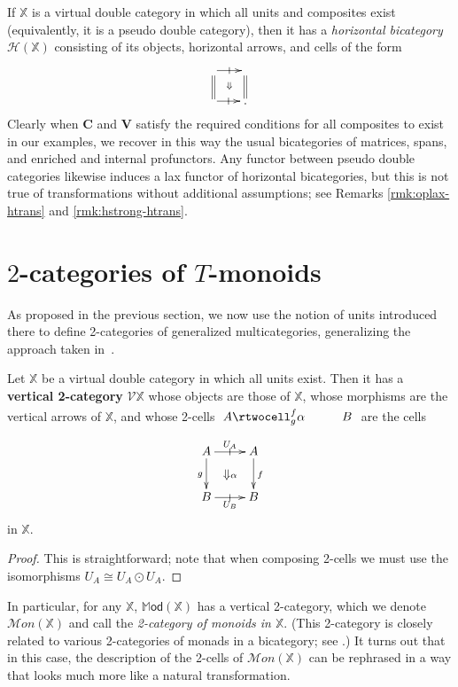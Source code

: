 \documentclass{tac}
\makeatletter
\newcommand{\calV}{\ensuremath{\mathcal{V}}}
\newcommand{\calH}{\ensuremath{\mathcal{H}}}
\newcommand{\mb}[1]{{\mathbf{#1}}}
\newcommand{\iso}{\cong}
\newcommand{\MOD}{\mathbb{M}\mathsf{od}}
\newcommand{\Mon}{\mathcal{M}\mathit{on}}
\numberwithin{equation}{section}
\def\currthmtype{}
\let\old@label\label
\def\label#1{%
    {\let\your@currentlabel\@currentlabel%
      \edef\@currentlabel{\currthmtype}%
      \old@label{label@name@#1}}%
    \old@label{#1}}
\makeatother
\begin{document}
\begin{remark}\label{rmk:horiz-bicat}
  If $\mathbb{X}$ is a virtual double category in which all units and
  composites exist (equivalently, it is a pseudo double category),
  then it has a \emph{horizontal bicategory} $\calH(\mathbb{X})$
  consisting of its objects, horizontal arrows, and cells of the
  form
  \[\xymatrix@-.5pc{ \ar[r]|-@{|}^-{} \ar@{=}[d] \ar@{}[dr]|{\Downarrow} &  \ar@{=}[d]\\
    \ar[r]|-@{|}_-{} & .}\]
  Clearly when $\mb{C}$ and $\mb{V}$ satisfy the required conditions
  for all composites to exist in our examples, we recover in this way
  the usual bicategories of matrices, spans, and enriched and internal
  profunctors.  Any functor between pseudo double categories likewise
  induces a lax functor of horizontal bicategories, but
  this is not true of transformations without additional assumptions;
  see Remarks \ref{rmk:oplax-htrans} and \ref{rmk:hstrong-htrans}.
\end{remark}


\section{$2$-categories of $T$-monoids}
\label{sec:2cat-tmon}

As proposed in the previous section, we now use the notion of units
introduced there to define 2-categories of generalized
multicategories, generalizing the approach taken
in~\cite[\S5.3]{leinster:higher-opds}.

\begin{proposition}\label{prop:2cat}
  Let $\mathbb{X}$ be a virtual double category in which all units
  exist.  Then it has a \textbf{vertical 2-category} $\calV\mathbb{X}$
  whose objects are those of $\mathbb{X}$, whose morphisms are the
  vertical arrows of $\mathbb{X}$, and whose 2-cells
  $\xymatrix{A\rtwocell^f_g{\alpha} &B}$ are the cells
  \[\xymatrix{A \ar[r]|-@{|}^{U_A}\ar[d]_g \ar@{}[dr]|{{\textstyle\Downarrow}\alpha}
    & A \ar[d]^f\\
    B\ar[r]|-@{|}_{U_B} & B}\]
  in $\mathbb{X}$.
\end{proposition}
\begin{proof}
  This is straightforward; note that when composing 2-cells we must
  use the isomorphisms $U_A\iso U_A\odot U_A$.
\end{proof}

In particular, for any $\mathbb{X}$, $\MOD(\mathbb{X})$ has a vertical
2-category, which we denote $\Mon(\mathbb{X})$ and call the
\emph{2-category of monoids in $\mathbb{X}$}.  (This 2-category is
closely related to various 2-categories of monads in a bicategory; see
\cite[\S2.3--2.4]{ls:ftm2}.)  It turns out that in this case, the
description of the 2-cells of $\Mon(\mathbb{X})$ can be rephrased in a
way that looks much more like a natural transformation.
\end{document}
